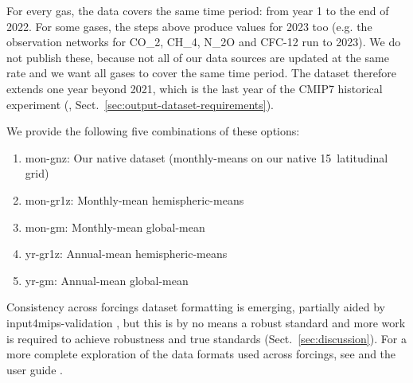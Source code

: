For every gas, the data covers the same time period: from year 1 to the end of 2022.
For some gases, the steps above produce values for 2023 too
(e.g. the observation networks for CO_2, CH_4, N_2O and CFC-12 run to 2023).
We do not publish these,
because not all of our data sources are updated at the same rate
and we want all gases to cover the same time period.
The dataset therefore extends one year beyond 2021, which is the last year of the CMIP7 historical experiment
(\citealp{dunne_cmip7_2025}, Sect.~\ref{sec:output-dataset-requirements}).

We provide the following five combinations of these options:
\begin{enumerate}
    \item mon-gnz: Our native dataset (monthly-means on our native 15\textdegree~latitudinal grid)
    \item mon-gr1z: Monthly-mean hemispheric-means
    \item mon-gm: Monthly-mean global-mean
    \item yr-gr1z: Annual-mean hemispheric-means
    \item yr-gm: Annual-mean global-mean
\end{enumerate}

Consistency across forcings dataset formatting is emerging,
partially aided by input4mips-validation \citep{input4mips-validation_docs_2026},
but this is by no means a robust standard
and more work is required to achieve robustness and true standards (Sect.~\ref{sec:discussion}).
For a more complete exploration of the data formats used across forcings,
see \citet{input4mips-cvs_docs_2026} and the user guide \citep{nicholls_historical-user-guide_2026}.

